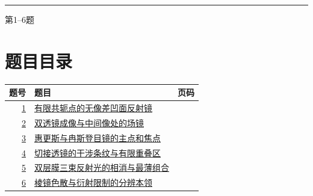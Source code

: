 \documentclass[UTF8,fontset=fandol,a4paper,11pt]{ctexart}
\begin{document}

\thispagestyle{empty}\vspace*{22mm}

\par\vspace{12mm}

\par\vspace{12mm}

\par\vspace{9mm}

\noindent\textcolor{accent}{\rule{\linewidth}{1pt}}\par\vspace{9mm}

\noindent 第1--6题\par\vfill\clearpage

\section*{题目目录}

\begin{longtable}{@{}r p{113mm} r@{}}\toprule 题号 & 题目 & 页码\\\midrule

\hyperref[q:1]{1} & \hyperref[q:1]{有限共轭点的无像差凹面反射镜} & \pageref{q:1} \\

\hyperref[q:2]{2} & \hyperref[q:2]{双透镜成像与中间像处的场镜} & \pageref{q:2} \\

\hyperref[q:3]{3} & \hyperref[q:3]{惠更斯与冉斯登目镜的主点和焦点} & \pageref{q:3} \\

\hyperref[q:4]{4} & \hyperref[q:4]{切接透镜的干涉条纹与有限重叠区} & \pageref{q:4} \\

\hyperref[q:5]{5} & \hyperref[q:5]{双层膜三束反射光的相消与最薄组合} & \pageref{q:5} \\

\hyperref[q:6]{6} & \hyperref[q:6]{棱镜色散与衍射限制的分辨本领} & \pageref{q:6} \\

\bottomrule\end{longtable}

\clearpage
\end{document}
